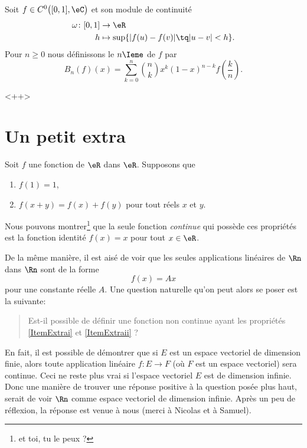 \begin{theorem}
    Soit \( f\in C^0\big( \mathopen[ 0 , 1 \mathclose],\eC \big)\) et son module de continuité
    \begin{equation}
        \begin{aligned}
            \omega\colon \mathopen[ 0 , 1 \mathclose]&\to \eR \\
            h&\mapsto \sup\{ | f(u)-f(v) |\tq | u-v |< h \}. 
        \end{aligned}
    \end{equation}
    Pour \( n\geq 0\) nous définissons le \( n\Ieme\)  de \( f\) par
    \begin{equation}
        B_n(f)(x)=\sum_{k=0}^{n}\binom{ n }{ k }x^k(1-x)^{n-k}f\left( \frac{ k }{ n } \right).
    \end{equation}
\end{theorem}
<++>

					\section{Un petit extra}

Soit $f$ une fonction de $\eR$ dans $\eR$. Supposons que 
\begin{enumerate}

\item		\label{ItemExtrai}
$f(1)=1$,

\item		\label{ItemExtraii}
$f(x+y)=f(x)+f(y)$ pour tout réels $x$ et $y$.

\end{enumerate}
Nous pouvons montrer\footnote{et toi, tu le peux ?} que la seule fonction {\it continue} qui possède ces propriétés est la fonction identité $f(x)=x$ pour tout $x\in\eR$.

De la même manière, il est aisé de voir que les seules applications linéaires de $\Rn$ dans $\Rn$ sont de la forme 
\begin{equation}
	f(x)=Ax
\end{equation}
pour une constante réelle $A$. Une question naturelle qu'on peut alors se poser est la suivante: 
\begin{quote} 
	Est-il possible de définir une fonction non continue ayant les propriétés \ref{ItemExtrai} et \ref{ItemExtraii} ?
\end{quote}
En fait, il est possible de démontrer que si $E$ est un espace vectoriel de dimension finie, alors toute application linéaire $f:E\rightarrow  F$ (où $F$ est un espace vectoriel) sera continue. Ceci ne reste plus vrai si l'espace vectoriel $E$ est de dimension infinie. Donc une manière de trouver une réponse positive à la question posée plus haut, serait de voir $\Rn$ comme espace vectoriel de dimension infinie. Après un peu de réflexion, la réponse est venue à nous (merci à Nicolas et à Samuel). 


